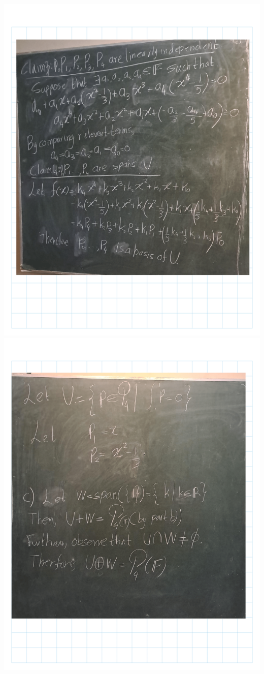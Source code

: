 \documentclass[
]{book}
\theoremstyle{definition}
\theoremstyle{definition}
\theoremstyle{definition}
\theoremstyle{definition}
\theoremstyle{remark}
\begin{document}
\includegraphics{fig/Ex 2B and 2C/Ex 2c (34).png}
\includegraphics{fig/Ex 2B and 2C/Ex 2c (35).png}
\end{document}
